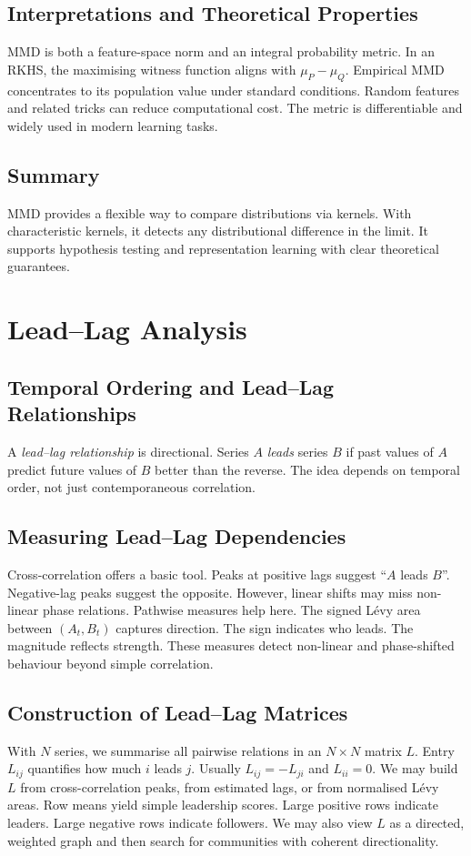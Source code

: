 \subsection{Interpretations and Theoretical Properties}
MMD is both a feature-space norm and an integral probability metric. In an RKHS, the maximising witness function aligns with $\mu_P - \mu_Q$. Empirical MMD concentrates to its population value under standard conditions. Random features and related tricks can reduce computational cost. The metric is differentiable and widely used in modern learning tasks.

\subsection{Summary}
MMD provides a flexible way to compare distributions via kernels. With characteristic kernels, it detects any distributional difference in the limit. It supports hypothesis testing and representation learning with clear theoretical guarantees.

\section{Lead–Lag Analysis}

\subsection{Temporal Ordering and Lead–Lag Relationships}
A \emph{lead–lag relationship} is directional. Series $A$ \emph{leads} series $B$ if past values of $A$ predict future values of $B$ better than the reverse. The idea depends on temporal order, not just contemporaneous correlation.

\subsection{Measuring Lead–Lag Dependencies}
Cross-correlation offers a basic tool. Peaks at positive lags suggest “$A$ leads $B$”. Negative-lag peaks suggest the opposite. However, linear shifts may miss non-linear phase relations. Pathwise measures help here. The signed Lévy area between $(A_t,B_t)$ captures direction. The sign indicates who leads. The magnitude reflects strength. These measures detect non-linear and phase-shifted behaviour beyond simple correlation.

\subsection{Construction of Lead–Lag Matrices}
With $N$ series, we summarise all pairwise relations in an $N\times N$ matrix $L$. Entry $L_{ij}$ quantifies how much $i$ leads $j$. Usually $L_{ij}=-L_{ji}$ and $L_{ii}=0$. We may build $L$ from cross-correlation peaks, from estimated lags, or from normalised Lévy areas. Row means yield simple leadership scores. Large positive rows indicate leaders. Large negative rows indicate followers. We may also view $L$ as a directed, weighted graph and then search for communities with coherent directionality.

